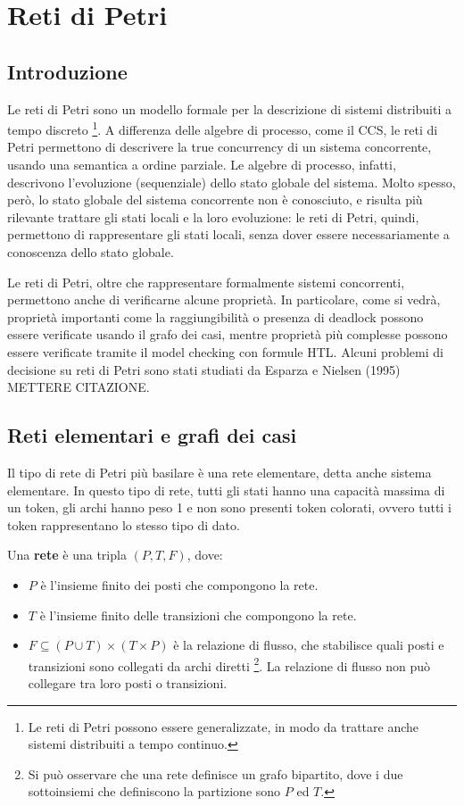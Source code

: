 \chapter{Reti di Petri}
\section{Introduzione}
Le reti di Petri sono un modello formale per la descrizione di sistemi
distribuiti a tempo discreto \footnote{Le reti di Petri possono essere
generalizzate, in modo da trattare anche sistemi distribuiti a tempo
continuo.}. A differenza delle algebre di processo, come il CCS,
le reti di Petri permettono di descrivere la true concurrency di un
sistema concorrente, usando una semantica a ordine parziale.
Le algebre di processo, infatti, descrivono l'evoluzione (sequenziale) dello
stato globale del sistema. Molto spesso, però, lo stato globale del sistema
concorrente non è conosciuto, e risulta più rilevante trattare gli stati
locali e la loro evoluzione: le reti di Petri, quindi, permettono di
rappresentare gli stati locali, senza dover essere necessariamente
a conoscenza dello stato globale.

Le reti di Petri, oltre che rappresentare formalmente sistemi concorrenti,
permettono anche di verificarne alcune proprietà.
In particolare, come si vedrà, proprietà importanti come la raggiungibilità o
presenza di deadlock possono essere verificate usando il grafo dei casi,
mentre proprietà più complesse possono essere verificate tramite il model
checking con formule HTL.
Alcuni problemi di decisione su reti di Petri sono stati studiati da
Esparza e Nielsen (1995) METTERE CITAZIONE.

\section{Reti elementari e grafi dei casi}
Il tipo di rete di Petri più basilare è una rete elementare, detta anche
sistema elementare.
In questo tipo di rete, tutti gli stati hanno una capacità massima di un token,
gli archi hanno peso 1 e non sono presenti token colorati, ovvero tutti i
token rappresentano lo stesso tipo di dato.

\begin{defn}
    Una \textbf{rete} è una tripla $(P, T, F)$, dove:
    \begin{itemize}
        \item $P$ è l'insieme finito dei posti che compongono la rete.
        \item $T$ è l'insieme finito delle transizioni che compongono la rete.
        \item $F \subseteq (P \cup T) \times (T \times P)$ è la relazione
        di flusso, che stabilisce quali posti e transizioni sono collegati
        da archi diretti
        \footnote{Si può osservare che una rete definisce un grafo bipartito,
        dove i due sottoinsiemi che definiscono la partizione sono $P$ ed $T$.}.
        La relazione di flusso non può collegare tra loro posti o transizioni.
    \end{itemize}
\end{defn}

